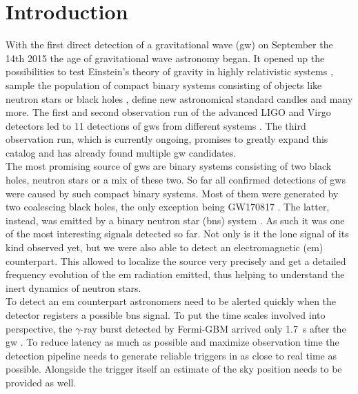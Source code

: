 \section{Introduction}
With the first direct detection of a gravitational wave (\gls{gw}) on September the 14th 2015 \cite{gw150914} the age of gravitational wave astronomy began. It opened up the possibilities to test Einstein's theory of gravity in highly relativistic systems \cite{test_gr_gw150914}, sample the population of compact binary systems consisting of objects like neutron stars or black holes \cite{population_binary_systems}, define new astronomical standard candles \cite{standard_candles} and many more. The first and second observation run of the advanced LIGO and Virgo detectors \cite{aligo, avirgo} led to 11 detections of \gls{gw}s from different systems \cite{catalog}. The third observation run, which is currently ongoing, promises to greatly expand this catalog and has already found multiple \gls{gw} candidates.\\
The most promising source of \gls{gw}s are binary systems consisting of two black holes, neutron stars or a mix of these two. So far all confirmed detections of \gls{gw}s were caused by such compact binary systems. Most of them were generated by two coalescing black holes, the only exception being GW170817 \cite{catalog}. The latter, instead, was emitted by a binary neutron star (\gls{bns}) system \cite{gw170817}. As such it was one of the most interesting signals detected so far. Not only is it the lone signal of its kind observed yet, but we were also able to detect an electromagnetic (\gls{em}) counterpart. This allowed to localize the source very precisely and get a detailed frequency evolution of the \gls{em} radiation emitted, thus helping to understand the inert dynamics of neutron stars.\\
To detect an \gls{em} counterpart astronomers need to be alerted quickly when the detector registers a possible \gls{bns} signal. To put the time scales involved into perspective, the $\gamma$-ray burst detected by Fermi-GBM arrived only \SI{1.7}{\s} after the \gls{gw} \cite{gw170817}. To reduce latency as much as possible and maximize observation time the detection pipeline needs to generate reliable triggers in as close to real time as possible. Alongside the trigger itself an estimate of the sky position needs to be provided as well.\\
